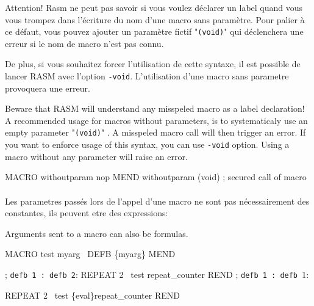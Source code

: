 \begin{xfr}
Attention! Rasm ne peut pas savoir si vous voulez déclarer un label quand vous vous trompez dans l'écriture du nom d'une macro sans paramètre.
Pour palier à ce défaut, vous pouvez ajouter un paramètre fictif "\texttt{(void)}"  qui déclenchera une erreur si le nom de macro n'est pas connu.

De plus, si vous souhaitez forcer l'utilisation de cette syntaxe, il est possible de lancer RASM avec l'option \texttt{-void}.
L'utilisation d'une macro sans parametre provoquera une erreur.
\end{xfr}

\begin{xen}
Beware that RASM will understand any misspeled macro as a label declaration!
A recommended usage for macros without parameters, is to systematicaly use an empty parameter "\texttt{(void)}" .
A misspeled macro call will then trigger an error.
If you want to enforce usage of this syntax, you can use \texttt{-void} option. Using a macro without any parameter will raise an error.

\end{xen}

\begin{code}
MACRO withoutparam
nop
MEND
withoutparam (void) ; secured call of macro
\end{code}

\paragraph{}

\begin{xfr}
Les parametres passés lors de l'appel d'une macro ne sont pas nécessairement des constantes, ils peuvent etre des expressions:
\end{xfr}

\begin{xen}
Arguments sent to a macro can also be formulas. %
\end{xen}

\begin{code}
MACRO test myarg
\ DEFB \{myarg\}
MEND

; \texttt{defb 1 : defb 2}:
REPEAT 2
\ test repeat\_counter
REND
; \texttt{defb 1 : defb }1:

REPEAT 2
\ test \{eval\}repeat\_counter
REND
\end{code}
